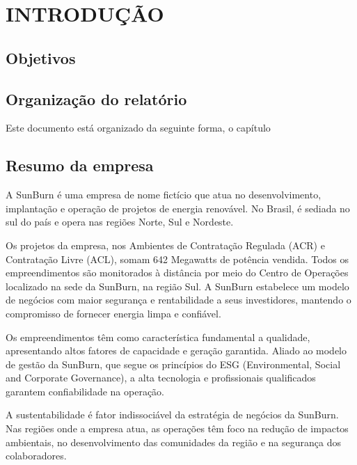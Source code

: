 \chapter{INTRODUÇÃO}
\label{chap:intro}

\section{Objetivos}
\label{sec:obj}

\section{Organização do relatório}
\label{sec:org}
Este documento está organizado da seguinte forma, o capítulo 

\section{Resumo da empresa}
\label{sec:rese}
A SunBurn é uma empresa de nome fictício que atua no desenvolvimento, implantação e operação de projetos de energia renovável. No Brasil, é sediada no sul do país e opera nas regiões Norte, Sul e Nordeste.

Os projetos da empresa, nos Ambientes de Contratação Regulada (ACR) e Contratação Livre (ACL), somam 642 Megawatts de potência vendida. Todos os empreendimentos são monitorados à distância por meio do Centro de Operações localizado na sede da SunBurn, na região Sul.
A SunBurn estabelece um modelo de negócios com maior segurança e rentabilidade a seus investidores, mantendo o compromisso de fornecer energia limpa e confiável.

Os empreendimentos têm como característica fundamental a qualidade, apresentando altos fatores de capacidade e geração garantida. Aliado ao modelo de gestão da SunBurn, que segue os princípios do ESG (Environmental, Social and Corporate Governance), a alta tecnologia e profissionais qualificados garantem confiabilidade na operação.

A sustentabilidade é fator indissociável da estratégia de negócios da SunBurn. Nas regiões onde a empresa atua, as operações têm foco na redução de impactos ambientais, no desenvolvimento das comunidades da região e na segurança dos colaboradores.